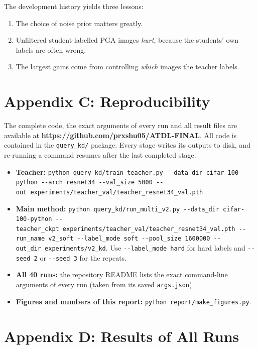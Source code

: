 \documentclass[
  10pt,
]{article}
\providecommand{\tightlist}{%
  \setlength{\itemsep}{0pt}\setlength{\parskip}{0pt}}
\begin{document}
The development history yields three lessons:

\begin{enumerate}
\def\labelenumi{\arabic{enumi}.}
\tightlist
\item
  The choice of noise prior matters greatly.
\item
  Unfiltered student-labelled PGA images \emph{hurt}, because the
  students' own labels are often wrong.
\item
  The largest gains come from controlling \emph{which} images the
  teacher labels.
\end{enumerate}

\hypertarget{appendix-c-reproducibility}{%
\section*{Appendix C:
Reproducibility}\label{appendix-c-reproducibility}}

The complete code, the exact arguments of every run and all result files
are available at \textbf{https://github.com/prxshu05/ATDL-FINAL}. All
code is contained in the \texttt{query\_kd/} package. Every stage writes
its outputs to disk, and re-running a command resumes after the last
completed stage.

\begin{itemize}
\tightlist
\item
  \textbf{Teacher:}
  \texttt{python\ query\_kd/train\_teacher.py\ -\/-data\_dir\ cifar-100-python\ -\/-arch\ resnet34\ -\/-val\_size\ 5000\ -\/-out\ experiments/teacher\_val/teacher\_resnet34\_val.pth}
\item
  \textbf{Main method:}
  \texttt{python\ query\_kd/run\_multi\_v2.py\ -\/-data\_dir\ cifar-100-python\ -\/-teacher\_ckpt\ experiments/teacher\_val/teacher\_resnet34\_val.pth\ -\/-run\_name\ v2\_soft\ -\/-label\_mode\ soft\ -\/-pool\_size\ 1600000\ -\/-out\_dir\ experiments/v2\_kd}.
  Use \texttt{-\/-label\_mode\ hard} for hard labels and
  \texttt{-\/-seed\ 2} or \texttt{-\/-seed\ 3} for the repeats.
\item
  \textbf{All 40 runs:} the repository README lists the exact
  command-line arguments of every run (taken from its saved
  \texttt{args.json}).
\item
  \textbf{Figures and numbers of this report:}
  \texttt{python\ report/make\_figures.py}.
\end{itemize}

\hypertarget{appendix-d-results-of-all-runs}{%
\section*{Appendix D: Results of All
Runs}\label{appendix-d-results-of-all-runs}}
\end{document}
